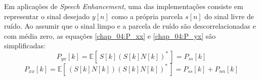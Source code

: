 Em aplicações de \textit{Speech Enhancement}, uma das implementações consiste em
representar o sinal desejado $y[n]$ como a própria parcela $s[n]$ do sinal livre
de ruído. Ao assumir que o sinal limpo e a parcela de ruído são
descorrelacionadas e com média zero, as equações \ref{chap_04:P_xx} e
\ref{chap_04:P_yx} são simplificadas:
\begin{equation}
    P_{yx}[k] = \mathbb{E}\left[\,S[k] \left( S[k]N[k]\right)^*\,\right] = P_{ss}[k]
\end{equation}
\begin{equation}
    P_{xx}[k] = \mathbb{E}\left[\,\left( S[k]N[k]\right)\left( S[k]N[k]\right)^*\,\right] = P_{ss}[k] + P_{nn}[k]
\end{equation}







